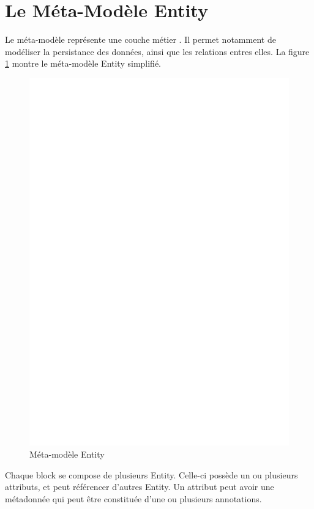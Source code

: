 \section{Le Méta-Modèle Entity}\label{sub:ent}


Le méta-modèle \kwentity{} représente une couche \og métier \fg{}. Il permet notamment de modéliser la persistance des données, ainsi que les relations entres elles. La figure \ref{fig:ent}  montre le méta-modèle Entity simplifié.

\begin{figure}[H]
  \centering
  \includegraphics[scale=.4]{img/Entity.eps}
  \caption{Méta-modèle Entity}
  \label{fig:ent}
\end{figure}

Chaque block se compose de plusieurs Entity. Celle-ci possède un ou plusieurs attributs, et peut référencer d'autres Entity. Un attribut peut avoir une métadonnée qui peut être constituée d'une ou plusieurs annotations.   

